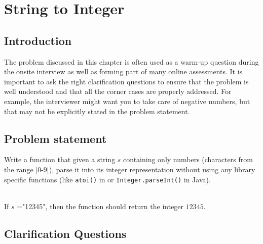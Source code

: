 %

\chapter{String to Integer}
\label{ch:string_to_int}
\section*{Introduction}
The problem discussed in this chapter is often used as a warm-up question during the onsite interview as well as forming part of many online assessments. It is important to ask the right clarification questions to ensure that the problem is well  understood and that all the corner cases are properly addressed. For example,  the interviewer might want you to take care of negative numbers, but that may not be explicitly stated in the problem statement.

\section{Problem statement}
\begin{exercise}
Write a function that given a string $s$ containing only numbers (characters from the range [0-9]), parse it into its integer representation without using any library specific functions (like \texttt{atoi()} in \CC or  \texttt{Integer.parseInt()} in Java).
\end{exercise}


\begin{example}
	\hfill \\
	If $s$ ="12345", then the function should return the integer $12345$.	
\end{example}


\section{Clarification Questions}

